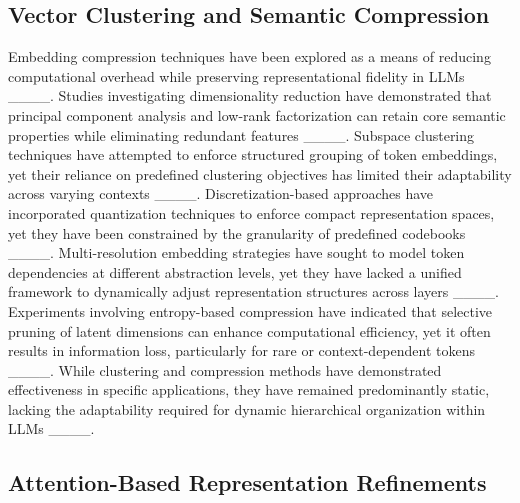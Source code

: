 \subsection{Vector Clustering and Semantic Compression}

Embedding compression techniques have been explored as a means of reducing computational overhead while preserving representational fidelity in LLMs ____. Studies investigating dimensionality reduction have demonstrated that principal component analysis and low-rank factorization can retain core semantic properties while eliminating redundant features ____. Subspace clustering techniques have attempted to enforce structured grouping of token embeddings, yet their reliance on predefined clustering objectives has limited their adaptability across varying contexts ____. Discretization-based approaches have incorporated quantization techniques to enforce compact representation spaces, yet they have been constrained by the granularity of predefined codebooks ____. Multi-resolution embedding strategies have sought to model token dependencies at different abstraction levels, yet they have lacked a unified framework to dynamically adjust representation structures across layers ____. Experiments involving entropy-based compression have indicated that selective pruning of latent dimensions can enhance computational efficiency, yet it often results in information loss, particularly for rare or context-dependent tokens ____. While clustering and compression methods have demonstrated effectiveness in specific applications, they have remained predominantly static, lacking the adaptability required for dynamic hierarchical organization within LLMs ____.

\subsection{Attention-Based Representation Refinements}

